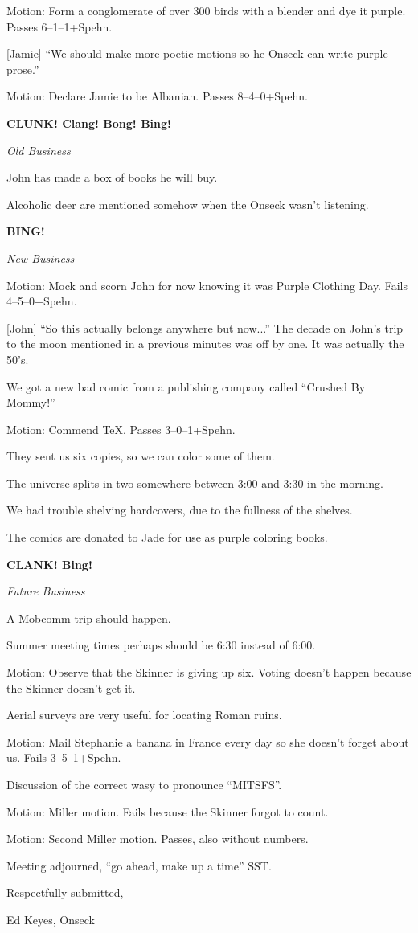 \documentclass[12pt]{article}
\newcommand{\bing}{{\bf BING!} }
\newcommand{\goto}[1]{\bing \vskip 12pt \centerline{{\em{#1}}}}
\begin{document}
Motion: Form a conglomerate of over 300 birds with a blender and dye
it purple.  Passes 6--1--1+Spehn.

[Jamie] ``We should make more poetic motions so he Onseck can write
purple prose.''

Motion: Declare Jamie to be Albanian.  Passes 8--4--0+Spehn.

{\bf CLUNK!  Clang!  Bong!  Bing!}\vskip 12pt \centerline{{\em{Old Business}}}

John has made a box of books he will buy.

Alcoholic deer are mentioned somehow when the Onseck wasn't listening.

\goto{New Business}

Motion: Mock and scorn John for now knowing it was Purple Clothing Day.
Fails 4--5--0+Spehn.

[John] ``So this actually belongs anywhere but now...''  The decade
on John's trip to the moon mentioned in a previous minutes was off
by one.  It was actually the 50's.

We got a new bad comic from a publishing company called ``Crushed
By Mommy!''

Motion: Commend TeX.  Passes 3--0--1+Spehn.

They sent us six copies, so we can color some of them.

The universe splits in two somewhere between 3:00 and 3:30 in the
morning.

We had trouble shelving hardcovers, due to the fullness of the shelves.

The comics are donated to Jade for use as purple coloring books.

{\bf CLANK!  Bing!}\vskip 12pt \centerline{{\em{Future Business}}}

A Mobcomm trip should happen.

Summer meeting times perhaps should be 6:30 instead of 6:00.

Motion: Observe that the Skinner is giving up six.  Voting doesn't happen
because the Skinner doesn't get it.

Aerial surveys are very useful for locating Roman ruins.

Motion: Mail Stephanie a banana in France every day so she doesn't
forget about us.  Fails 3--5--1+Spehn.

Discussion of the correct wasy to pronounce ``MITSFS''.

Motion: Miller motion.  Fails because the Skinner forgot to count.

Motion: Second Miller motion.  Passes, also without numbers.

\vspace{12pt}

\noindent
Meeting adjourned, ``go ahead, make up a time'' SST.

\vspace{18pt}

\centerline{Respectfully submitted,}
\centerline{Ed Keyes, Onseck}
\end{document}
